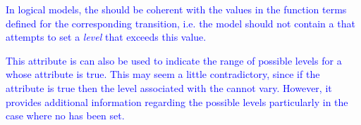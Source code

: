 \textcolor{blue}{In logical models, the  should be coherent with the  values in the function terms defined for the corresponding transition, i.e. the model should not contain a \FunctionTerm that attempts to set a \emph{level} that exceeds this value.}

\textcolor{blue}{This attribute is can also be used to indicate the range of possible levels for a \QualitativeSpecies whose  attribute is true. This may seem a little contradictory, since if the  attribute is true then the level associated with the \QualitativeSpecies cannot vary. However, it provides additional information regarding the possible levels particularly in the case where no  has been set.}

%
%
%
%
%
%



